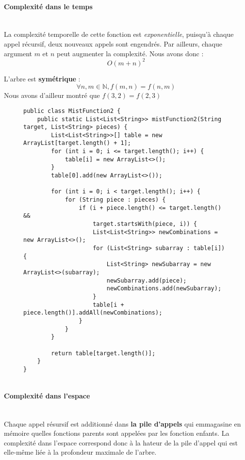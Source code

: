 \documentclass[9pt]{report}
\begin{document}
\begin{multicols*}{2}
  \paragraph{Complexité dans le temps}
  \mbox{}\\
  La complexité temporelle de cette fonction est \textit{exponentielle}, puisqu'à 
  chaque appel récursif, deux nouveaux appels sont engendrés. Par ailleurs, 
  chaque argument $m$ et $n$ peut augmenter la complexité. Nous avons donc : 
  \[ O( m +n )^2 \]

  \begin{note}{}{}
      L'arbre est \textbf{symétrique} : 
      \[ \forall n, m \in \mathbb{N}, f(m, n) = f(n, m) \]   
      Nous avons d'ailleur montré que $f(3, 2) = f(2, 3)$
  \end{note}        
  \begin{figure*}
   \begin{lstlisting}[style=JavaDraculaWhite]
 public class MistFunction2 {
    public static List<List<String>> mistFunction2(String target, List<String> pieces) {
        List<List<String>>[] table = new ArrayList[target.length() + 1];
        for (int i = 0; i <= target.length(); i++) {
            table[i] = new ArrayList<>();
        }
        table[0].add(new ArrayList<>());

        for (int i = 0; i < target.length(); i++) {
            for (String piece : pieces) {
                if (i + piece.length() <= target.length() &&
                    target.startsWith(piece, i)) {
                    List<List<String>> newCombinations = new ArrayList<>();
                    for (List<String> subarray : table[i]) {
                        List<String> newSubarray = new ArrayList<>(subarray);
                        newSubarray.add(piece);
                        newCombinations.add(newSubarray);
                    }
                    table[i + piece.length()].addAll(newCombinations);
                }
            }
        }

        return table[target.length()];
    }
}
    
  \end{lstlisting}    
  \end{figure*}
  \paragraph{Complexité dans l'espace}
  \mbox{}\\
  Chaque appel résursif est additionné dans 
  \textbf{la pile d'appels} qui emmagasine en mémoire 
  quelles fonctions parents sont appelées par les fonction enfants. 
  La complexité dans l'espace correspond donc à la hateur de la pile d'appel 
  qui est elle-même liée à la profondeur maximale de l'arbre. 



\end{multicols*}
\end{document}
